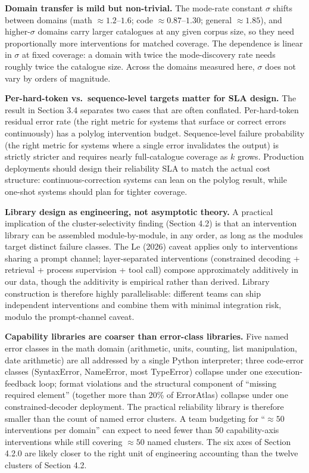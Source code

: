\documentclass[
]{article}
\begin{document}
\textbf{Domain transfer is mild but non-trivial.} The mode-rate constant
\(\sigma\) shifts between domains (math \(\approx 1.2\)--\(1.6\); code
\(\approx 0.87\)--\(1.30\); general \(\approx 1.85\)), and
higher-\(\sigma\) domains carry larger catalogues at any given corpus
size, so they need proportionally more interventions for matched
coverage. The dependence is linear in \(\sigma\) at fixed coverage: a
domain with twice the mode-discovery rate needs roughly twice the
catalogue size. Across the domains measured here, \(\sigma\) does not
vary by orders of magnitude.

\textbf{Per-hard-token vs.~sequence-level targets matter for SLA
design.} The result in Section 3.4 separates two cases that are often
conflated. Per-hard-token residual error rate (the right metric for
systems that surface or correct errors continuously) has a polylog
intervention budget. Sequence-level failure probability (the right
metric for systems where a single error invalidates the output) is
strictly stricter and requires nearly full-catalogue coverage as \(k\)
grows. Production deployments should design their reliability SLA to
match the actual cost structure: continuous-correction systems can lean
on the polylog result, while one-shot systems should plan for tighter
coverage.

\textbf{Library design as engineering, not asymptotic theory.} A
practical implication of the cluster-selectivity finding (Section 4.2)
is that an intervention library can be assembled module-by-module, in
any order, as long as the modules target distinct failure classes. The
Le (2026) caveat applies only to interventions sharing a prompt channel;
layer-separated interventions (constrained decoding + retrieval +
process supervision + tool call) compose approximately additively in our
data, though the additivity is empirical rather than derived. Library
construction is therefore highly parallelisable: different teams can
ship independent interventions and combine them with minimal integration
risk, modulo the prompt-channel caveat.

\textbf{Capability libraries are coarser than error-class libraries.}
Five named error classes in the math domain (arithmetic, units,
counting, list manipulation, date arithmetic) are all addressed by a
single Python interpreter; three code-error classes (SyntaxError,
NameError, most TypeError) collapse under one execution-feedback loop;
format violations and the structural component of ``missing required
element'' (together more than 20\% of ErrorAtlas) collapse under one
constrained-decoder deployment. The practical reliability library is
therefore smaller than the count of named error clusters. A team
budgeting for ``\(\approx 50\) interventions per domain'' can expect to
need fewer than 50 capability-axis interventions while still covering
\(\approx 50\) named clusters. The six axes of Section 4.2.0 are likely
closer to the right unit of engineering accounting than the twelve
clusters of Section 4.2.
\end{document}
